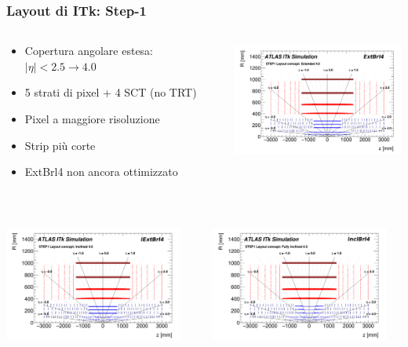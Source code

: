 \documentclass{beamer}
\begin{document}

\begin{frame}
\frametitle{Layout di ITk: Step-1}


\begin{columns}
\begin{column}{0.5\textwidth}
	\begin{itemize}
	\small
	\item Copertura angolare estesa: $|\eta| < 2.5 \rightarrow 4.0$
	\item 5 strati di pixel + 4 SCT (no TRT)
	\item Pixel a maggiore risoluzione
	\item Strip pi\`u corte
	\item ExtBrl4 non ancora ottimizzato
	\end{itemize}
	\ \ \ \
\end{column}
\begin{column}{0.5\textwidth}
\includegraphics[width=\textwidth,height=3.8cm]{ExtBrl4}
\end{column}
\end{columns}

\begin{columns}
\begin{column}{0.5\textwidth}
\includegraphics[width=\textwidth,height=3.8cm]{IExtBrl4}
\end{column}
\begin{column}{0.5\textwidth}
\includegraphics[width=\textwidth,height=3.8cm]{InclBrl4}
\end{column}
\end{columns}

\end{frame}
\end{document}
